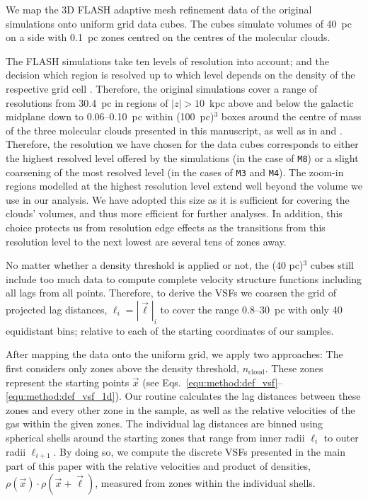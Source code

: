 \documentclass{aa}		%
\begin{document}
We map the 3D FLASH adaptive mesh refinement data of the original simulations  onto uniform grid data cubes.
The cubes simulate volumes of 40~pc on a side with 0.1~pc zones centred on the centres of the molecular clouds. 

The FLASH simulations take ten levels of resolution into account; and the decision which region is resolved up to which level depends on the density of the respective grid cell .
Therefore, the original simulations cover a range of resolutions from 30.4~pc in regions of $|z| > 10$~kpc above and below the galactic midplane down to 0.06--0.10~pc within (100~pc)$^3$ boxes around the centre of mass of the three molecular clouds presented in this manuscript, as well as in  and . 
Therefore, the resolution we have chosen for the data cubes corresponds to either the highest resolved level offered by the simulations (in the case of \texttt{M8}) or a slight coarsening of the most resolved level (in the cases of \texttt{M3} and \texttt{M4}).
The zoom-in regions modelled at the highest resolution level extend well beyond the volume we use in our analysis.
We have adopted this size as it is sufficient for covering the clouds' volumes, and thus more efficient for further analyses. In addition, this choice protects us from resolution edge effects as the transitions from this resolution level to the next lowest are several tens of zones away. 

No matter whether a density threshold is applied or not, the (40 pc)$^3$ cubes still include too much data to compute complete velocity structure functions including all lags from all points.
Therefore, to derive the VSFs we coarsen the grid of projected lag distances, $\ell_i = |\vec{\ell}|_i$ to cover the range 0.8--30~pc with only 40 equidistant bins; relative to each of the starting coordinates of our samples. 

After mapping the data onto the uniform grid, we apply two approaches: 
The first considers only zones above the density threshold, $n_\mathrm{cloud}$.
These zones represent the starting points $\vec{x}$ (see Eqs.~\ref{equ:method:def_vsf}--\ref{equ:method:def_vsf_1d}).
Our routine calculates the lag distances between these zones and every other zone in the sample, as well as the relative velocities of the gas within the given zones. 
The individual lag distances are binned using spherical shells around the starting zones that range from inner radii $\ell_{i}$ to outer radii $\ell_{i+1}$. 
By doing so, we compute the discrete VSFs presented in the main part of this paper with the relative velocities and product of densities, $\rho(\vec{x}) \cdot \rho(\vec{x}+\vec{\ell})$, measured from zones within the individual shells.
\end{document}
